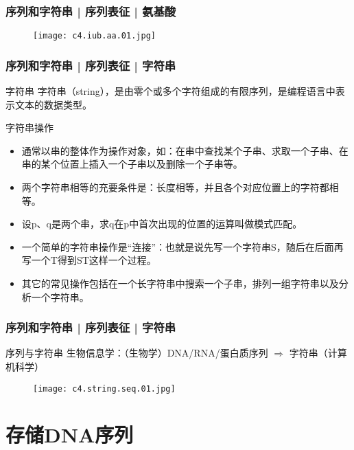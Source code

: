 \begin{frame}
  \frametitle{序列和字符串 | 序列表征 | 氨基酸}
  \begin{figure}
    \centering
    \texttt{[image: c4.iub.aa.01.jpg]}
  \end{figure}
\end{frame}

\begin{frame}
  \frametitle{序列和字符串 | 序列表征 | 字符串}
  \begin{block}{字符串}
    字符串（string），是由零个或多个字符组成的有限序列，是编程语言中表示文本的数据类型。
  \end{block}
  \pause
  \begin{block}{字符串操作}
    \begin{itemize}
      \item 通常以串的整体作为操作对象，如：在串中查找某个子串、求取一个子串、在串的某个位置上插入一个子串以及删除一个子串等。
      \item 两个字符串相等的充要条件是：长度相等，并且各个对应位置上的字符都相等。
      \item 设p、q是两个串，求q在p中首次出现的位置的运算叫做模式匹配。
      \item 一个简单的字符串操作是“连接”：也就是说先写一个字符串S，随后在后面再写一个T得到ST这样一个过程。
      \item 其它的常见操作包括在一个长字符串中搜索一个子串，排列一组字符串以及分析一个字符串。
    \end{itemize}
  \end{block}
\end{frame}

\begin{frame}
  \frametitle{序列和字符串 | 序列表征 | 字符串}
  \begin{block}{序列与字符串}
    生物信息学：（生物学）DNA/RNA/蛋白质序列 $\Longrightarrow$ 字符串（计算机科学）
  \end{block}
  \begin{figure}
    \centering
    \texttt{[image: c4.string.seq.01.jpg]}
  \end{figure}
\end{frame}

\section{存储DNA序列}
